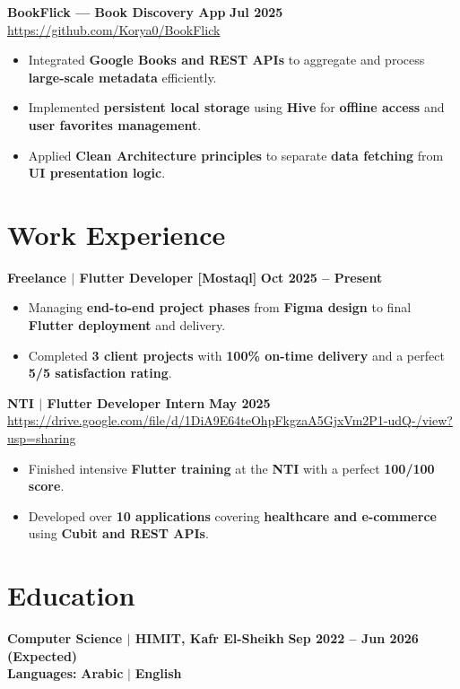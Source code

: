 \documentclass[a4paper,11pt]{article}
\newcommand{\entry}[2]{\textbf{#1} \hfill \textbf{#2}}
\begin{document}
\vspace{6pt}
\noindent\entry{BookFlick --- Book Discovery App}{Jul 2025}\\[1pt]
\small\href{https://github.com/Korya0/BookFlick}{https://github.com/Korya0/BookFlick}\\[2pt]
\begin{itemize}[leftmargin=0.15in, labelsep=0.5em, nosep]
\item \small{Integrated \textbf{Google Books and REST APIs} to aggregate and process \textbf{large-scale metadata} efficiently.}
\item \small{Implemented \textbf{persistent local storage} using \textbf{Hive} for \textbf{offline access} and \textbf{user favorites management}.}
\item \small{Applied \textbf{Clean Architecture principles} to separate \textbf{data fetching} from \textbf{UI presentation logic}.}
\end{itemize}
\section{Work Experience}
\noindent\entry{Freelance $|$ Flutter Developer [Mostaql]}{Oct 2025 -- Present}\\[2pt]
\begin{itemize}[leftmargin=0.15in, labelsep=0.5em, nosep]
\item \small{Managing \textbf{end-to-end project phases} from \textbf{Figma design} to final \textbf{Flutter deployment} and delivery.}
\item \small{Completed \textbf{3 client projects} with \textbf{100\% on-time delivery} and a perfect \textbf{5/5 satisfaction rating}.}
\end{itemize}
\vspace{6pt}
\noindent\entry{NTI $|$ Flutter Developer Intern}{May 2025}\\[1pt]
\small\href{https://drive.google.com/file/d/1DiA9E64teOhpFkgzaA5GjxVm2P1-udQ-/view?usp=sharing}{https://drive.google.com/file/d/1DiA9E64teOhpFkgzaA5GjxVm2P1-udQ-/view?usp=sharing}\\[2pt]
\begin{itemize}[leftmargin=0.15in, labelsep=0.5em, nosep]
\item \small{Finished intensive \textbf{Flutter training} at the \textbf{NTI} with a perfect \textbf{100/100 score}.}
\item \small{Developed over \textbf{10 applications} covering \textbf{healthcare and e-commerce} using \textbf{Cubit and REST APIs}.}
\end{itemize}
\section{Education}
\noindent\entry{Computer Science $|$ HIMIT, Kafr El-Sheikh}{Sep 2022 -- Jun 2026 (Expected)}\\[3pt]
\textbf{Languages:} \textbf{Arabic} $|$ \textbf{English}
\end{document}
